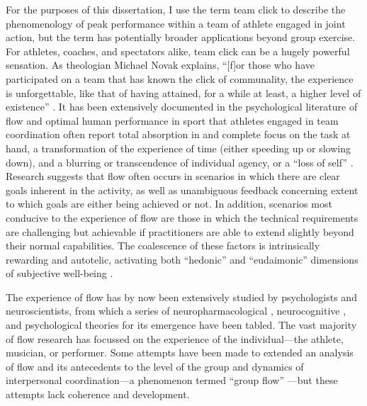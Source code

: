 \begin{CJK}{UTF8}{gbsn}

    For the purposes of this dissertation, I use the term team click to describe the phenomenology of peak performance within a team of athlete engaged in joint action, but the term has potentially broader applications beyond group exercise.  For athletes, coaches, and spectators alike, team click can be a hugely powerful sensation.  As theologian Michael Novak explains, ``[f]or those who have participated on a team that has known the click of communality, the experience is unforgettable, like that of having attained, for a while at least, a higher level of existence'' \citep[11]{White2011}.  It has been extensively documented in the psychological literature of flow and optimal human performance in sport that athletes engaged in team coordination often report total absorption in and complete focus on the task at hand, a transformation of the experience of time (either speeding up or slowing down), and a blurring or transcendence of individual agency, or a ``loss of self''   \citep{Csikszentmihalyi1992,Jackson1995,Jackson1999,McNeill1995}.  Research suggests that flow often occurs in scenarios in which there are clear goals inherent in the activity, as well as unambiguous feedback concerning extent to which goals are either being achieved or not.  In addition, scenarios most conducive to the experience of flow are those in which the technical requirements are challenging but achievable if practitioners are able to extend slightly beyond their normal capabilities\citep{Fong2015}.
    The coalescence of these factors is intrinsically rewarding and autotelic\citep{Csikszentmihalyi1975}, activating both ``hedonic'' and ``eudaimonic'' dimensions of subjective well-being \citep{Huta2010,Fave2009}.



    The experience of flow has by now been extensively studied by psychologists and neuroscientists, from which a series of neuropharmacological \citep{Boecker2008}, neurocognitive \citep{Dietrich2006,Dietrich2011,Labelle2013}, and psychological \citep{Csikszentmihalyi1992} theories for its emergence have been tabled.  The vast majority of flow research has focussed on the experience of the individual---the athlete, musician, or performer.  Some attempts have been made to extended an analysis of flow and its antecedents to the level of the group and dynamics of interpersonal coordination---a phenomenon termed ``group flow'' \citep{Sawyer2006}---but these attempts lack coherence and development.


\end{CJK}
